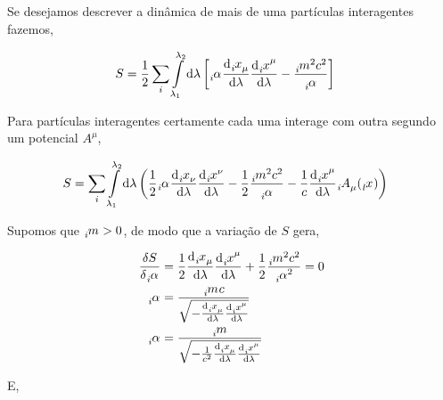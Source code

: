 \documentclass[twoside]{amsart}
\numberwithin{equation}{section}
\begin{document}
Se desejamos descrever a dinâmica de mais de uma partículas interagentes fazemos,

\begin{align}
    S&=\frac12\sum\limits_i\int\limits_{\lambda_1}^{\lambda_2}\dd{\lambda}\qty[\tensor[_i]{\alpha}{}\dv{\tensor[_i]{x}{_\mu}}{\lambda}\dv{\tensor[_i]{x}{^\mu}}{\lambda}-\frac{\tensor[_i]{m}{^2}c^2}{\tensor[_i]{\alpha}{}}]
\end{align}

Para partículas interagentes certamente cada uma interage com outra segundo um potencial $A^\mu$,

\begin{align}
    S&=\sum\limits_i\int\limits_{\lambda_1}^{\lambda_2}\dd{\lambda}\qty(\frac12\tensor[_i]{\alpha}{}\dv{\tensor[_i]{x}{_\nu}}{\lambda}\dv{\tensor[_i]{x}{^\nu}}{\lambda}-\frac12 \frac{\tensor[_i]{m}{^2}c^2}{\tensor[_i]{\alpha}{}}-\frac1c\dv{\tensor[_i]{x}{^\mu}}{\lambda}\tensor[_i]{A}{_\mu}\qty(\tensor[_l]{x}{}))
\end{align}

Supomos que $\tensor[_i]{m}{}>0$, de modo que a variação de $S$ gera,

\begin{align}
    \fdv{S}{\tensor[_i]{\alpha}{}}&=\frac12\dv{\tensor[_i]{x}{_\mu}}{\lambda}\dv{\tensor[_i]{x}{^\mu}}{\lambda}+\frac12\frac{\tensor[_i]{m}{^2}c^2}{\tensor[_i]{\alpha}{^2}}=0\\
    \tensor[_i]{\alpha}{}&=\frac{\tensor[_i]{m}{}c}{\sqrt{-\dv{\tensor[_i]{x}{_\mu}}{\lambda}\dv{\tensor[_i]{x}{^\mu}}{\lambda}}}\\
    \tensor[_i]{\alpha}{}&=\frac{\tensor[_i]{m}{}}{\sqrt{-\frac{1}{c^2}\dv{\tensor[_i]{x}{_\mu}}{\lambda}\dv{\tensor[_i]{x}{^\mu}}{\lambda}}}
\end{align}

E,
\end{document}
